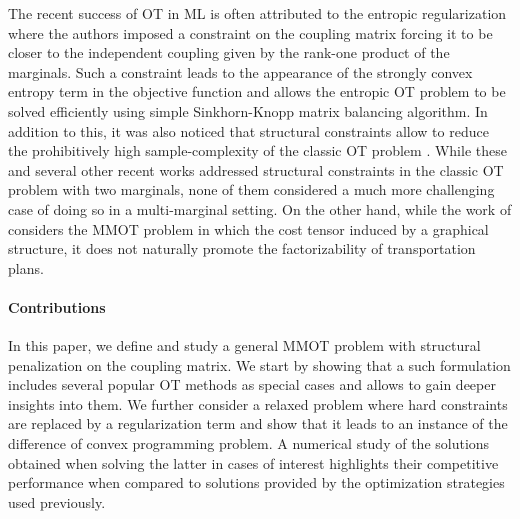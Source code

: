 \documentclass{article}
\begin{document}
The recent success of OT in ML is often attributed to the entropic regularization \citep{Cuturi13} where the authors imposed a 
constraint on the coupling matrix forcing it to be closer to the independent coupling given by the rank-one product of the marginals. 
Such a constraint leads to the appearance of the strongly convex entropy term in the objective function and allows the entropic 
OT problem to be solved efficiently using simple Sinkhorn-Knopp matrix balancing algorithm. In addition to this, it was also noticed 
that structural constraints allow to reduce the prohibitively high sample-complexity of the classic OT problem 
\citep{Genevay19,Forrow18}. While these and several other recent works \citep{Chiheng21,Meyer21a} addressed structural constraints 
in the classic OT problem with two marginals, none of them considered a much more challenging case of doing so in a multi-marginal setting. 
On the other hand, while the work of \citep{Haasler20} considers the MMOT problem in which the cost tensor induced by a graphical 
structure, it does not naturally promote the factorizability of transportation plans.

\paragraph{Contributions} In this paper, we define and study a general MMOT problem with structural penalization on the coupling matrix. 
We start by showing that a such formulation includes several popular OT methods as special cases and allows to gain deeper insights 
into them. We further consider a relaxed problem where hard constraints are replaced by a regularization term and show that it leads 
to an instance of the difference of convex programming problem. A numerical study of the solutions obtained when solving the latter 
in cases of interest highlights their competitive performance when compared to solutions provided by the optimization 
strategies used previously. 
\end{document}
